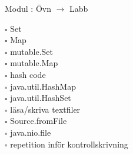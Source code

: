 
    Modul : Övn  $\rightarrow$ Labb 
    \begin{multicols}{3}\SlideFontTiny
    $\square$ Set \\
$\square$ Map \\
$\square$ mutable.Set \\
$\square$ mutable.Map \\
$\square$ hash code \\
$\square$ java.util.HashMap \\
$\square$ java.util.HashSet \\
$\square$ läsa/skriva textfiler \\
$\square$ Source.fromFile \\
$\square$ java.nio.file \\
$\square$ repetition inför kontrollskrivning \\
    \end{multicols}
    